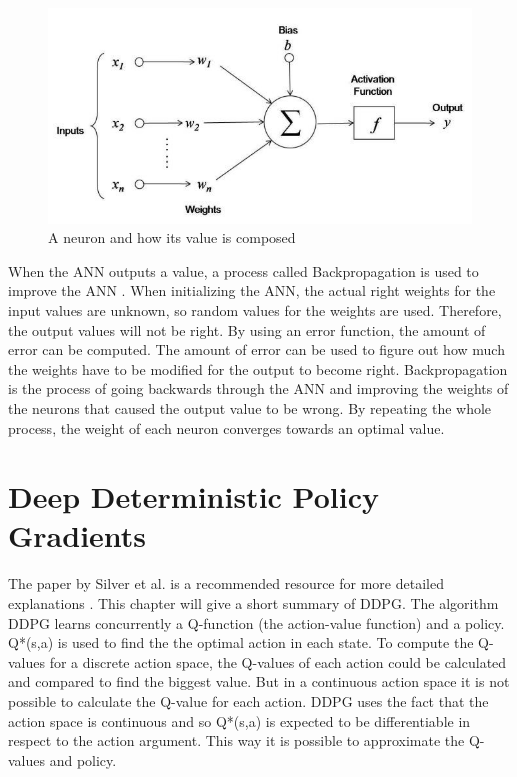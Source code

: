 \begin{figure} [h]	
	\centering
	\includegraphics[width=1\textwidth]{figures/neuron.jpeg}
	\caption{A neuron and how its value is composed \cite{neuron.jpeg}}
	\label{neuron}
\end{figure}

\vspace{0.5cm}

When the ANN outputs a value, a process called Backpropagation is used to improve the ANN \cite{backprop}. When initializing the ANN, the actual right weights for the input values are unknown, so random values for the weights are used. Therefore, the output values will not be right. By using an error function, the amount of error can be computed. The amount of error can be used to figure out how much the weights have to be modified for the output to become right. Backpropagation is the process of going backwards through the ANN and improving the weights of the neurons that caused the output value to be wrong. By repeating the whole process, the weight of each neuron converges towards an optimal value. 

\vspace{0.5cm}

\section{Deep Deterministic Policy Gradients}

The paper by Silver et al. is a recommended resource for more detailed explanations \cite{ddpg}. This chapter will give a short summary of DDPG.
The algorithm DDPG learns concurrently a Q-function (the action-value function) and a policy. \cite{ddpg}
Q*(s,a) is used to find the the optimal action in each state.
To compute the Q-values for a discrete action space, the Q-values of each action could be calculated and compared to find the biggest value. But in a continuous action space it is not possible to calculate the Q-value for each action. DDPG uses the fact that the action space is continuous and so Q*(s,a) is expected to be differentiable in respect to the action argument. \cite{ddpg}
This way it is possible to approximate the Q-values and policy.

